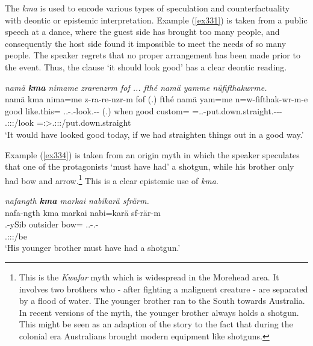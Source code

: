 The   \emph{kma} is used to encode various types of speculation and counterfactuality with deontic or epistemic interpretation. Example (\ref{ex331}) is taken from a public speech at a dance, where the guest side has brought too many people, and consequently the host side found it impossible to meet the needs of so many people. The speaker regrets that no proper arrangement has been made prior to the event. Thus, the clause `it should look good' has a clear deontic reading.

\begin{exe}
 	\ex \emph{namä \textbf{kma} nimame zrarenzrm fof ... fthé namä yamme nüfifthakwrme.}\\
 	\glll namä kma nima=me z-ra-re-nzr-m fof (.) fthé namä yam=me n=w-fifthak-wr-m-e\\
 	good \Pot{} like.this=\Ins{} \Tsg.\F.\Bet-\Irr.\Vc-look.\Ext-\Ndu-\Dur{} \Emph{} (.) when good custom=\Ins{} \Immpst=\Tsg.\F.\Alph-put.down.straight.\Ext-\Ndu-\Dur-\Fnsg{}\\
	{} {} {} \footnotesize{\Tsg.\F:\Sbj:\Irr:\Ipfv/look} {} {} {} {} {} \footnotesize{\Immpst=\Fpl:\Sbj>\Tsg.\F:\Obj:\Nonpast:\Dur/put.down.straight}\\
	\trans `It would have looked good today, if we had straighten things out in a good way.' 
	\label{ex331}
\end{exe}

Example (\ref{ex334}) is taken from an origin myth in which the speaker speculates that one of the protagonists `must have had' a shotgun, while his brother only had bow and arrow.\footnote{This is the \emph{Kwafar} myth which is widespread in the Morehead area. It involves two brothers who - after fighting a malignent creature - are separated by a flood of water. The younger brother ran to the South towards Australia. In recent versions of the myth, the younger brother always holds a shotgun. This might be seen as an adaption of the story to the fact that during the colonial era Australians brought modern equipment like shotguns.} This is a clear epistemic use of \emph{kma}.

\begin{exe}
	\ex \emph{nafangth \textbf{kma} markai nabikarä sfrärm.}\\
	\glll nafa-ngth kma markai nabi=karä sf-rär-m\\
	\Third.\Poss{}-ySib \Pot{} outsider bow=\Prop{} \Tsg.\Masc.\Betatwo-\Cop.\Ndu-\Dur\\
	{} {} {} {} \footnotesize{\Tsg.\Masc:\Sbj:\Pst:\Dur/be}\\
	\trans `His younger brother must have had a shotgun.' 
	\label{ex334}
\end{exe}

